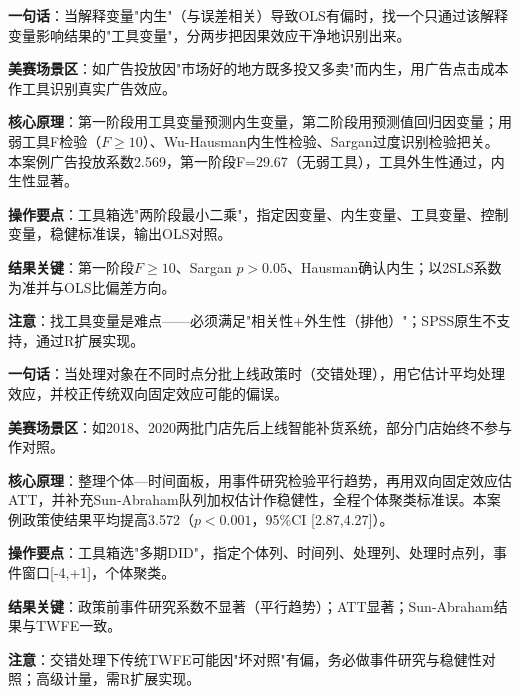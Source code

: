 \begin{algobrief}
\textbf{一句话}：当解释变量"内生"（与误差相关）导致OLS有偏时，找一个只通过该解释变量影响结果的"工具变量"，分两步把因果效应干净地识别出来。

\textbf{美赛场景区}：如广告投放因"市场好的地方既多投又多卖"而内生，用广告点击成本作工具识别真实广告效应。

\textbf{核心原理}：第一阶段用工具变量预测内生变量，第二阶段用预测值回归因变量；用弱工具F检验（$F\geq10$）、Wu-Hausman内生性检验、Sargan过度识别检验把关。本案例广告投放系数2.569，第一阶段F=29.67（无弱工具），工具外生性通过，内生性显著。

\textbf{操作要点}：工具箱选"两阶段最小二乘"，指定因变量、内生变量、工具变量、控制变量，稳健标准误，输出OLS对照。

\textbf{结果关键}：第一阶段$F\geq10$、Sargan $p>0.05$、Hausman确认内生；以2SLS系数为准并与OLS比偏差方向。

\textbf{注意}：找工具变量是难点——必须满足"相关性+外生性（排他）"；SPSS原生不支持，通过R扩展实现。
\end{algobrief}


\begin{algobrief}
\textbf{一句话}：当处理对象在不同时点分批上线政策时（交错处理），用它估计平均处理效应，并校正传统双向固定效应可能的偏误。

\textbf{美赛场景区}：如2018、2020两批门店先后上线智能补货系统，部分门店始终不参与作对照。

\textbf{核心原理}：整理个体—时间面板，用事件研究检验平行趋势，再用双向固定效应估ATT，并补充Sun-Abraham队列加权估计作稳健性，全程个体聚类标准误。本案例政策使结果平均提高3.572（$p<0.001$，95\%CI [2.87,4.27]）。

\textbf{操作要点}：工具箱选"多期DID"，指定个体列、时间列、处理列、处理时点列，事件窗口[-4,+1]，个体聚类。

\textbf{结果关键}：政策前事件研究系数不显著（平行趋势）；ATT显著；Sun-Abraham结果与TWFE一致。

\textbf{注意}：交错处理下传统TWFE可能因"坏对照"有偏，务必做事件研究与稳健性对照；高级计量，需R扩展实现。
\end{algobrief}


